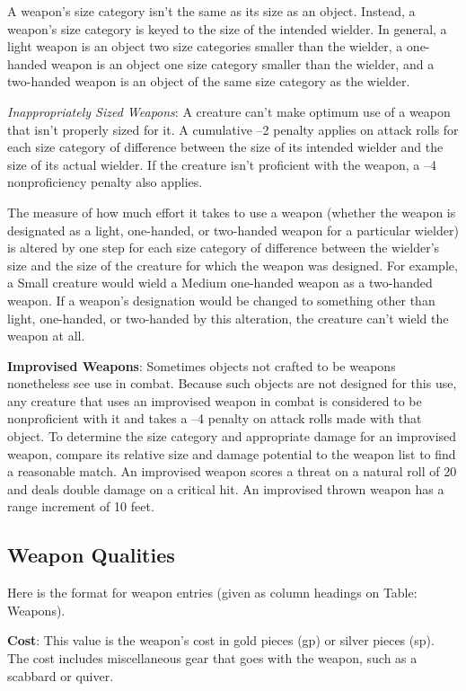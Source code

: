 A weapon's size category isn't the same as its size as an object. Instead, a weapon's size category is keyed to the size of the intended wielder. In general, a light weapon is an object two size categories smaller than the wielder, a one-handed weapon is an object one size category smaller than the wielder, and a two-handed weapon is an object of the same size category as the wielder.
		
\textit{Inappropriately Sized Weapons}: A creature can't make optimum use of a weapon that isn't properly sized for it. A cumulative --2 penalty applies on attack rolls for each size category of difference between the size of its intended wielder and the size of its actual wielder. If the creature isn't proficient with the weapon, a --4 nonproficiency penalty also applies.
		
The measure of how much effort it takes to use a weapon (whether the weapon is designated as a light, one-handed, or two-handed weapon for a particular wielder) is altered by one step for each size category of difference between the wielder's size and the size of the creature for which the weapon was designed. For example, a Small creature would wield a Medium one-handed weapon as a two-handed weapon. If a weapon's designation would be changed to something other than light, one-handed, or two-handed by this alteration, the creature can't wield the weapon at all.
		
\textbf{Improvised Weapons}: Sometimes objects not crafted to be weapons nonetheless see use in combat. Because such objects are not designed for this use, any creature that uses an improvised weapon in combat is considered to be nonproficient with it and takes a --4 penalty on attack rolls made with that object. To determine the size category and appropriate damage for an improvised weapon, compare its relative size and damage potential to the weapon list to find a reasonable match. An improvised weapon scores a threat on a natural roll of 20 and deals double damage on a critical hit. An improvised thrown weapon has a range increment of 10 feet.
	
\subsection{Weapon Qualities}

		
Here is the format for weapon entries (given as column headings on Table: Weapons).
		
\textbf{Cost}: This value is the weapon's cost in gold pieces (gp) or silver pieces (sp). The cost includes miscellaneous gear that goes with the weapon, such as a scabbard or quiver.
		
